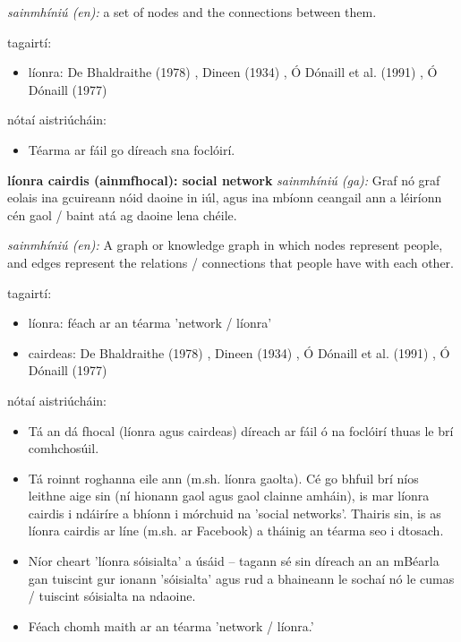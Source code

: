 \documentclass{article}
\begin{document}
\textit{sainmhíniú (en):} a set of nodes and the connections between them.

tagairtí:
\begin{itemize}
	\item líonra: De Bhaldraithe (1978) \cite{de-bhaldraithe}, Dineen (1934) \cite{dineen}, Ó Dónaill et al. (1991) \cite{focloir-beag}, Ó Dónaill (1977) \cite{odonaill}
\end{itemize}

nótaí aistriúcháin:
\begin{itemize}
	\item Téarma ar fáil go díreach sna foclóirí.
\end{itemize}


\textbf{líonra cairdis (ainmfhocal): social network}
\textit{sainmhíniú (ga):} Graf nó graf eolais ina gcuireann nóid daoine in iúl, agus ina mbíonn ceangail ann a léiríonn cén gaol / baint atá ag daoine lena chéile.

\textit{sainmhíniú (en):} A graph or knowledge graph in which nodes represent people, and edges represent the relations / connections that people have with each other.

tagairtí:
\begin{itemize}
	\item líonra: féach ar an téarma 'network / líonra'
	\item cairdeas: De Bhaldraithe (1978) \cite{de-bhaldraithe}, Dineen (1934) \cite{dineen}, Ó Dónaill et al. (1991) \cite{focloir-beag}, Ó Dónaill (1977) \cite{odonaill}
\end{itemize}

nótaí aistriúcháin:
\begin{itemize}
	\item Tá an dá fhocal (líonra agus cairdeas) díreach ar fáil ó na foclóirí thuas le brí comhchosúil.
	\item Tá roinnt roghanna eile ann (m.sh. líonra gaolta). Cé go bhfuil brí níos leithne aige sin (ní hionann gaol agus gaol clainne amháin), is mar líonra cairdis i ndáiríre a bhíonn i mórchuid na 'social networks'. Thairis sin, is as líonra cairdis ar líne (m.sh. ar Facebook) a tháinig an téarma seo i dtosach.
	\item Níor cheart 'líonra sóisialta' a úsáid -- tagann sé sin díreach an an mBéarla gan tuiscint gur ionann 'sóisialta' agus rud a bhaineann le sochaí nó le cumas / tuiscint sóisialta na ndaoine.
	\item Féach chomh maith ar an téarma 'network / líonra.'
\end{itemize}
\end{document}
